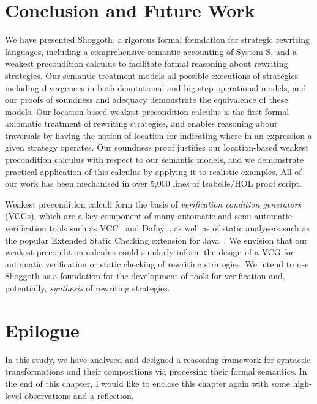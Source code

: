 \section{Conclusion and Future Work}
\label{chap4:conclusion-future-work}
We have presented Shoggoth, a rigorous formal foundation for strategic rewriting languages, including a comprehensive semantic accounting of System S, and a weakest precondition calculus to facilitate formal reasoning about rewriting strategies. Our semantic treatment models all possible executions of strategies including divergences in both denotational and big-step operational models, and our proofs of soundness and adequacy demonstrate the equivalence of these models. Our location-based weakest precondition calculus is the first formal axiomatic treatment of rewriting strategies, and enables reasoning about traversals by having the notion of location for indicating where in an expression a given strategy operates. Our soundness proof justifies our location-based weakest precondition calculus with respect to our semantic models, and we demonstrate practical application of this calculus by applying it to realistic examples. All of our work has been mechanised in over 5,000 lines of Isabelle/HOL proof script.

Weakest precondition calculi form the basis of \emph{verification condition generators} (VCGs), which are a key component of many automatic and semi-automatic verification tools such as VCC~\citep{DBLP:conf/tphol/CohenDHLMSST09} and Dafny~\citep{DBLP:conf/lpar/Leino10}, as well as of static analysers such as the popular Extended Static Checking extension for Java~\citep{DBLP:conf/pldi/FlanaganLLNSS02, DBLP:journals/ipl/Leino05}. We envision that our weakest precondition calculus could similarly inform the design of a VCG for automatic verification or static checking of rewriting strategies. We intend to use Shoggoth as a foundation for the development of tools for verification and, potentially, \emph{synthesis} of rewriting strategies.

\section{Epilogue}
\label{chap4:epilogue}
In this study, we have analysed and designed a reasoning framework for syntactic transformations and their compositions via processing their formal semantics. In the end of this chapter, I would like to enclose this chapter again with some high-level observations and a reflection.

